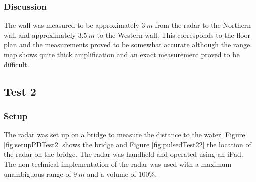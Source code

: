 \subsubsection{Discussion}

The wall was measured to be approximately $3\ m$ from the radar to the Northern wall and approximately $3.5\ m$ to the Western wall. This corresponds to the floor plan and the measurements proved to be somewhat accurate although the range map shows quite thick amplification and an exact measurement proved to be difficult.

\subsection{Test 2}
\subsubsection{Setup}
The radar was set up on a bridge to measure the distance to the water. Figure \ref{fig:setupPDTest2} shows the bridge and Figure \ref{fig:pulsedTest22} the location of the radar on the bridge. The radar was handheld and operated using an iPad. The non-technical implementation of the radar was used with a maximum unambiguous range of $9\ m$ and a volume of $100\%$. 

